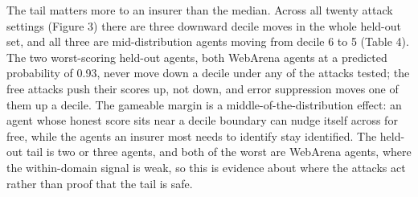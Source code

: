\documentclass[
  11pt,
  a4paper,
]{article}
\begin{document}
The tail matters more to an insurer than the median. Across all twenty
attack settings (Figure 3) there are three downward decile moves in the
whole held-out set, and all three are mid-distribution agents moving
from decile 6 to 5 (Table 4). The two worst-scoring held-out agents,
both WebArena agents at a predicted probability of 0.93, never move down
a decile under any of the attacks tested; the free attacks push their
scores up, not down, and error suppression moves one of them up a
decile. The gameable margin is a middle-of-the-distribution effect: an
agent whose honest score sits near a decile boundary can nudge itself
across for free, while the agents an insurer most needs to identify stay
identified. The held-out tail is two or three agents, and both of the
worst are WebArena agents, where the within-domain signal is weak, so
this is evidence about where the attacks act rather than proof that the
tail is safe.
\end{document}
